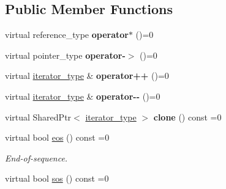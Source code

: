 \subsection*{Public Member Functions}
\begin{DoxyCompactItemize}
\item 
virtual reference\+\_\+type {\bfseries operator$\ast$} ()=0\hypertarget{classAudio_1_1VirtualIterator_ae88c50723b392a9bc6b993417fafee7e}{}\label{classAudio_1_1VirtualIterator_ae88c50723b392a9bc6b993417fafee7e}

\item 
virtual pointer\+\_\+type {\bfseries operator-\/$>$} ()=0\hypertarget{classAudio_1_1VirtualIterator_aa980497ff51034766e146f4739c82dd6}{}\label{classAudio_1_1VirtualIterator_aa980497ff51034766e146f4739c82dd6}

\item 
virtual \hyperlink{classAudio_1_1VirtualIterator}{iterator\+\_\+type} \& {\bfseries operator++} ()=0\hypertarget{classAudio_1_1VirtualIterator_a75a5588676ce2e65c188e2656d900a00}{}\label{classAudio_1_1VirtualIterator_a75a5588676ce2e65c188e2656d900a00}

\item 
virtual \hyperlink{classAudio_1_1VirtualIterator}{iterator\+\_\+type} \& {\bfseries operator-\/-\/} ()=0\hypertarget{classAudio_1_1VirtualIterator_ada9940d97febb217e4e1c0ab78a32986}{}\label{classAudio_1_1VirtualIterator_ada9940d97febb217e4e1c0ab78a32986}

\item 
virtual Shared\+Ptr$<$ \hyperlink{classAudio_1_1VirtualIterator}{iterator\+\_\+type} $>$ {\bfseries clone} () const =0\hypertarget{classAudio_1_1VirtualIterator_a9c3dd6554fec1f49bb34a62ab494fa63}{}\label{classAudio_1_1VirtualIterator_a9c3dd6554fec1f49bb34a62ab494fa63}

\item 
virtual bool \hyperlink{classAudio_1_1VirtualIterator_ae9dc26121331a0e63ed223d60b4c98c9}{eos} () const =0\hypertarget{classAudio_1_1VirtualIterator_ae9dc26121331a0e63ed223d60b4c98c9}{}\label{classAudio_1_1VirtualIterator_ae9dc26121331a0e63ed223d60b4c98c9}

\begin{DoxyCompactList}\small\item\em End-\/of-\/sequence. \end{DoxyCompactList}\item 
virtual bool \hyperlink{classAudio_1_1VirtualIterator_a854d31e0f65cbb208ba6090924ff2499}{sos} () const =0\hypertarget{classAudio_1_1VirtualIterator_a854d31e0f65cbb208ba6090924ff2499}{}\label{classAudio_1_1VirtualIterator_a854d31e0f65cbb208ba6090924ff2499}


\end{DoxyCompactItemize}
